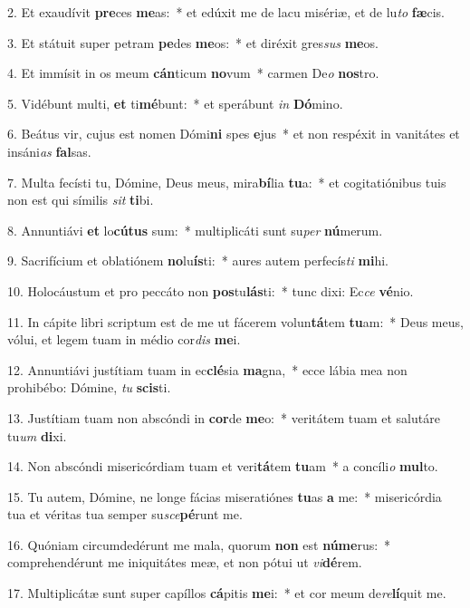 2. Et exaudívit \textbf{pre}ces \textbf{me}as:~*  et edúxit me de lacu misériæ, et de lu\textit{to} \textbf{fæ}cis.\

3. Et státuit super petram \textbf{pe}des \textbf{me}os:~*  et diréxit gres\textit{sus} \textbf{me}os.\

4. Et immísit in os meum \textbf{cán}ticum \textbf{no}vum~*  carmen De\textit{o} \textbf{nos}tro.\

5. Vidébunt multi, \textbf{et} ti\textbf{mé}bunt:~*  et sperábunt \textit{in} \textbf{Dó}mino.\

6. Beátus vir, cujus est nomen Dómi\textbf{ni} spes \textbf{e}jus~*  et non respéxit in vanitátes et insáni\textit{as} \textbf{fal}sas.\

7. Multa fecísti tu, Dómine, Deus meus, mira\textbf{bí}lia \textbf{tu}a:~*  et cogitatiónibus tuis non est qui símilis \textit{sit} \textbf{ti}bi.\

8. Annuntiávi \textbf{et} lo\textbf{cú}\textbf{tus} sum:~*  multiplicáti sunt su\textit{per} \textbf{nú}merum.\

9. Sacrifícium et oblatiónem \textbf{no}lu\textbf{ís}ti:~*  aures autem perfecís\textit{ti} \textbf{mi}hi.\

10. Holocáustum et pro peccáto non \textbf{pos}tu\textbf{lás}ti:~*  tunc dixi: Ec\textit{ce} \textbf{vé}nio.\

11. In cápite libri scriptum est de me ut fácerem volun\textbf{tá}tem \textbf{tu}am:~*  Deus meus, vólui, et legem tuam in médio cor\textit{dis} \textbf{me}i.\

12. Annuntiávi justítiam tuam in ec\textbf{clé}sia \textbf{ma}gna,~*  ecce lábia mea non prohibébo: Dómine, \textit{tu} \textbf{scis}ti.\

13. Justítiam tuam non abscóndi in \textbf{cor}de \textbf{me}o:~*  veritátem tuam et salutáre tu\textit{um} \textbf{di}xi.\

14. Non abscóndi misericórdiam tuam et veri\textbf{tá}tem \textbf{tu}am~*  a concíli\textit{o} \textbf{mul}to.\

15. Tu autem, Dómine, ne longe fácias miseratiónes \textbf{tu}as \textbf{a} me:~*  misericórdia tua et véritas tua semper su\textit{sce}\textbf{pé}runt me.\

16. Quóniam circumdedérunt me mala, quorum \textbf{non} est \textbf{nú}\textbf{me}rus:~*  comprehendérunt me iniquitátes meæ, et non pótui ut \textit{vi}\textbf{dé}rem.\

17. Multiplicátæ sunt super capíllos \textbf{cá}pitis \textbf{me}i:~*  et cor meum de\textit{re}\textbf{lí}quit me.\

